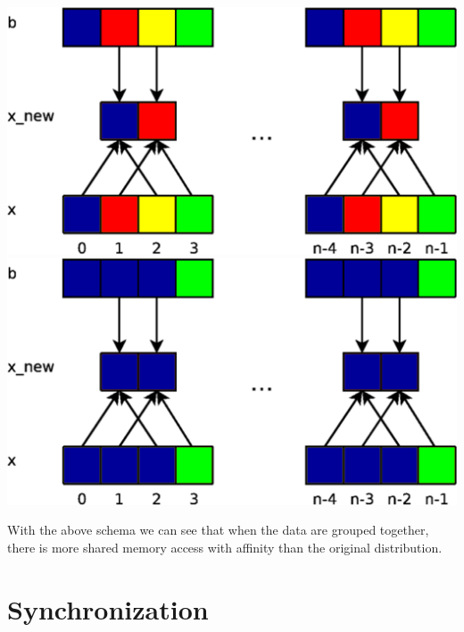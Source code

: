 \documentclass{report}
\begin{document}
\begin{center}
    \includegraphics[scale=0.070]{Images/Laplace_unoptimized_da.png}
    \label{fig4}
    \includegraphics[scale=0.070]{Images/Lapalce_optmized_data.png}
    \label{fig5}
\end{center}

With the above schema we can see that when the data are grouped together, there is more shared memory access with affinity than the original distribution.

\section{Synchronization}
\end{document}
